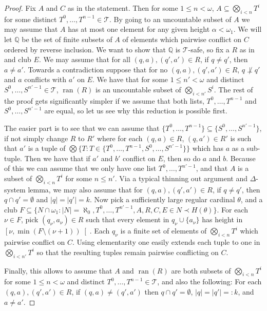 \documentclass[a4paper,noamsfonts]{amsart}
\theoremstyle{definition}
\newcommand{\Q}{\mathbb{Q}}
\newcommand{\seb}{\subseteq}
\newcommand{\setm}{\setminus}
\newcommand{\es}{\emptyset}
\newcommand{\1}{\mathbbm{1}}
\newcommand{\T}{\mathcal{T}}
\DeclareMathOperator{\ran}{ran}
\begin{document}
\begin{proof}
  Fix $A$ and $C$ as in the statement. Then for some
  $1 \le n < \omega$, $A \seb \bigotimes_{i < n}T^{i}$ for some
  distinct $T^{0},\dots,T^{n-1} \in \T$.  By going to an uncountable
  subset of $A$ we may assume that $A$ has at most one element for any
  given height $\alpha < \omega_{1}$. We will let
  $\mathbb{Q}$ be the set of finite subsets of $A$ of elements which pairwise
  conflict on $C$ ordered by reverse inclusion.
  We want to show that $\Q$ is $\T$-safe,
  so fix a $R$ as in  and club $E$. We may assume that
  for all $(q,a),(q',a') \in R$, if $q \neq q'$, then $a \neq a'$.
  Towards
  a contradiction suppose that for no $(q,a),(q',a') \in R$,
  $q \not\perp q'$ and $a$ conflicts with $a'$ on $E$.
  We have that
  for some $1 \le n' < \omega$ and
  distinct $S^{0},\dots,S^{n'-1} \in \T$,
  $\ran(R)$ is an uncountable subset of $\bigotimes_{i < n'}S^{i}$. The rest
  of the proof gets significantly simpler if we assume that both lists,
  $T^{0},\dots,T^{n-1}$ and $S^{0},\dots,S^{n'-1}$ are equal, so let us
  see why this reduction is possible first.

  The easier part is to see that we can assume that
  $\{T^{0},\dots,T^{n-1}\} \seb \{S^{0},\dots,S^{n'-1}\}$, if not
  simply change $R$ to $R'$ where for each $(q,a) \in R$, $(q,a') \in R'$
  is such that $a'$ is a tuple of
  $\bigotimes\{T : T \in \{T^{0},\dots,T^{n-1},S^{0},\dots,S^{n'-1}\}\}$ which
  has $a$ as a sub-tuple. Then we have that if $a'$ and $b'$ conflict on $E$,
  then so do $a$ and $b$. Because of this we can assume that we only
  have one list $T^{0},\dots,T^{n'-1}$, and that $A$ is a subset
  of $\bigotimes_{i < n}T^{i}$ for some $n \le n'$. Via a typical thinning out
  argument and $\Delta$-system lemma, we may also assume that
  for $(q,a),(q',a') \in R$, if $q \neq q'$, then $q \cap q' = \es$
  and $|q| = |q'| = k$. Now
  pick a sufficiently large regular cardinal $\theta$, and a club
  $F \seb \{N \cap \omega_{1} : |N| = \aleph_{0}, T^{0},\dots,T^{n'-1},
  A,R,C,E \in N \prec H(\theta)\}$. For each $\nu \in F$,
  pick $(q_{\nu},a_{\nu}) \in R$
  such that every element in $q_{\nu} \cup \{a_{\nu}\}$ has height
  in $\left[\nu,\min(F\setm(\nu + 1))\right[$. Each $q_{\nu}$ is a finite set of
  elements of $\bigotimes_{i<n}T^{i}$ which pairwise conflict on $C$.
  Using elementarity one easily extends each tuple to one
  in $\bigotimes_{i < n'}T^{i}$ so that the resulting tuples remain
  pairwise conflicting on $C$.

  Finally, this allows to assume that $A$ and $\ran(R)$ are both
  subsets of $\bigotimes_{i < n}T^{i}$ for some $1 \le n < \omega$ and
  distinct $T^{0},\dots,T^{n-1} \in \T$, and also the following:
  For each $(q,a),(q',a') \in R$, if $(q,a) \neq (q',a')$ then
  $q \cap q' = \es$, $|q| = |q'| =: k$, and $a \neq a'$.


\end{proof}
\end{document}
